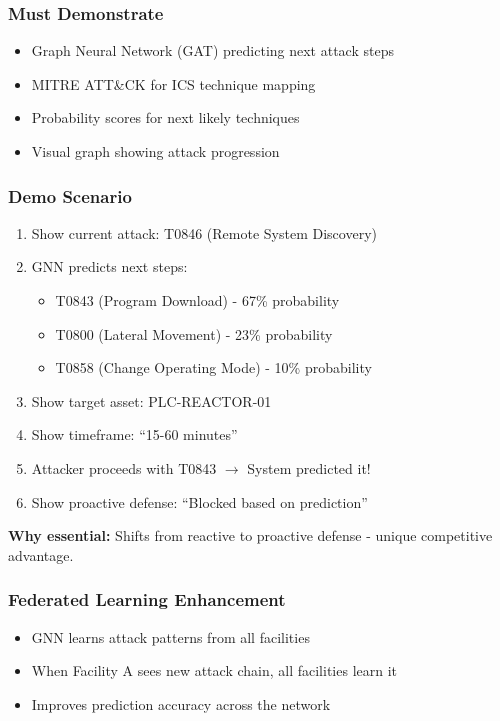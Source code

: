 \documentclass[11pt,a4paper]{article}
\begin{document}
\subsubsection{Must Demonstrate}

\begin{itemize}[leftmargin=*]
    \item Graph Neural Network (GAT) predicting next attack steps
    \item MITRE ATT\&CK for ICS technique mapping
    \item Probability scores for next likely techniques
    \item Visual graph showing attack progression
\end{itemize}

\subsubsection{Demo Scenario}

\begin{enumerate}[leftmargin=*]
    \item Show current attack: T0846 (Remote System Discovery)
    \item GNN predicts next steps:
    \begin{itemize}
        \item T0843 (Program Download) - 67\% probability
        \item T0800 (Lateral Movement) - 23\% probability
        \item T0858 (Change Operating Mode) - 10\% probability
    \end{itemize}
    \item Show target asset: PLC-REACTOR-01
    \item Show timeframe: ``15-60 minutes''
    \item Attacker proceeds with T0843 $\rightarrow$ System predicted it!
    \item Show proactive defense: ``Blocked based on prediction''
\end{enumerate}

\textbf{Why essential:} Shifts from reactive to proactive defense - unique competitive advantage.

\subsubsection{Federated Learning Enhancement}

\begin{itemize}[leftmargin=*]
    \item GNN learns attack patterns from all facilities
    \item When Facility A sees new attack chain, all facilities learn it
    \item Improves prediction accuracy across the network
\end{itemize}
\end{document}
